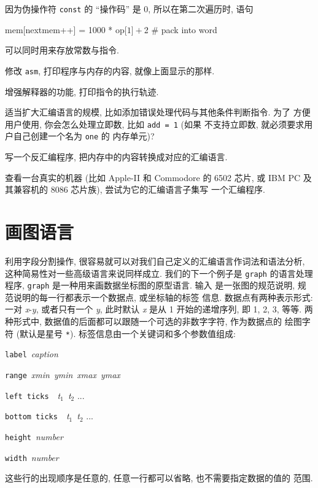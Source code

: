 因为伪操作符 \texttt{const} 的 ``操作码'' 是 0, 所以在第二次遍历时, 语句
\begin{awkcode}
    mem[nextmem++] = 1000 * op[$1] + $2  # pack into word
\end{awkcode}
可以同时用来存放常数与指令.

\begin{exercise}
    \label{exer:asm}
    修改 \texttt{asm}, 打印程序与内存的内容, 就像上面显示的那样.
\end{exercise}

\begin{exercise}
    增强解释器的功能, 打印指令的执行轨迹.
\end{exercise}

\begin{exercise}
    适当扩大汇编语言的规模, 比如添加错误处理代码与其他条件判断指令. 为了
    方便用户使用, 你会怎么处理立即数, 比如 \texttt{add = 1} (如果
    不支持立即数, 就必须要求用户自己创建一个名为 \texttt{one} 的
    内存单元)?
\end{exercise}

\begin{exercise}
    写一个反汇编程序, 把内存中的内容转换成对应的汇编语言.
\end{exercise}

\begin{exercise}
    查看一台真实的机器 (比如 Apple-II 和 Commodore 的 6502 芯片, 或
    IBM PC 及其兼容机的 8086 芯片族), 尝试为它的汇编语言子集写
    一个汇编程序.
\end{exercise}

\section{画图语言}
\label{sec:a_language_for_drawing_graphs}

利用字段分割操作, 很容易就可以对我们自己定义的汇编语言作词法和语法分析,
这种简易性对一些高级语言来说同样成立. 我们的下一个例子是 \texttt{graph}
的语言处理程序, \texttt{graph} 是一种用来画数据坐标图的原型语言. 输入
是一张图的规范说明, 规范说明的每一行都表示一个数据点, 或坐标轴的标签
信息. 数据点有两种表示形式: 一对 \textit{x}-\textit{y}, 或者只有一个
\textit{y}, 此时默认 \textit{x} 是从 1 开始的递增序列, 即 1, 2, 3, 等等.
两种形式中, 数据值的后面都可以跟随一个可选的非数字字符, 作为数据点的
绘图字符 (默认是星号 \verb'*').  标签信息由一个关键词和多个参数值组成:
\begin{pattern}
\indent\texttt{label}\ \textit{caption} \par
\indent\texttt{range}\ \textit{xmin}\ \textit{ymin}\ \textit{xmax}\
    \textit{ymax} \par
\indent\texttt{left ticks}\ \ \textit{t}$_1$\ \textit{t}$_2$ ... \par
\indent\texttt{bottom ticks}\ \ \textit{t}$_1$\ \textit{t}$_2$ ... \par
\indent\texttt{height}\ \textit{number}\par
\indent\texttt{width}\ \textit{number}\par
\end{pattern}
这些行的出现顺序是任意的, 任意一行都可以省略, 也不需要指定数据的值的
范围.

